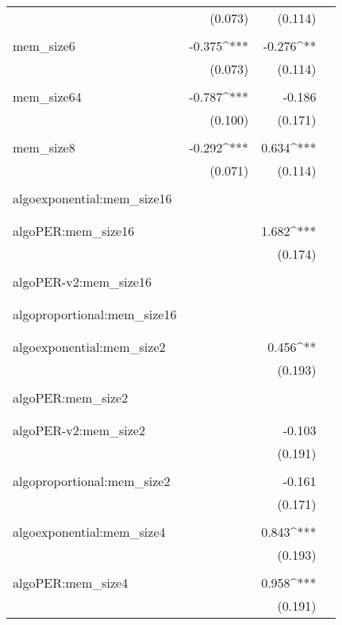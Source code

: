 \begin{table}[!htbp]
\begin{tabular}{@{\extracolsep{5pt}}lD{.}{.}{-3} D{.}{.}{-3} D{.}{.}{-3} }
  & (0.073) & (0.114) &  \\ 
  & & & \\ 
 mem\_size6 & -0.375^{***} & -0.276^{**} &  \\ 
  & (0.073) & (0.114) &  \\ 
  & & & \\ 
 mem\_size64 & -0.787^{***} & -0.186 &  \\ 
  & (0.100) & (0.171) &  \\ 
  & & & \\ 
 mem\_size8 & -0.292^{***} & 0.634^{***} &  \\ 
  & (0.071) & (0.114) &  \\ 
  & & & \\ 
 algoexponential:mem\_size16 &  &  &  \\ 
  &  &  &  \\ 
  & & & \\ 
 algoPER:mem\_size16 &  & 1.682^{***} &  \\ 
  &  & (0.174) &  \\ 
  & & & \\ 
 algoPER-v2:mem\_size16 &  &  &  \\ 
  &  &  &  \\ 
  & & & \\ 
 algoproportional:mem\_size16 &  &  &  \\ 
  &  &  &  \\ 
  & & & \\ 
 algoexponential:mem\_size2 &  & 0.456^{**} &  \\ 
  &  & (0.193) &  \\ 
  & & & \\ 
 algoPER:mem\_size2 &  &  &  \\ 
  &  &  &  \\ 
  & & & \\ 
 algoPER-v2:mem\_size2 &  & -0.103 &  \\ 
  &  & (0.191) &  \\ 
  & & & \\ 
 algoproportional:mem\_size2 &  & -0.161 &  \\ 
  &  & (0.171) &  \\ 
  & & & \\ 
 algoexponential:mem\_size4 &  & 0.843^{***} &  \\ 
  &  & (0.193) &  \\ 
  & & & \\ 
 algoPER:mem\_size4 &  & 0.958^{***} &  \\ 
  &  & (0.191) &  \\ 

\end{tabular}
\end{table}
